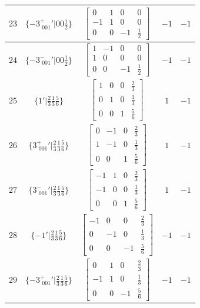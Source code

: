 \documentclass[fleqn,8pt]{jsarticle}
\begin{document}
\begin{longtable}{ccccc}
$ 23 $ & $ \{-3^{+}_{\,\,001}{}'|0 0 \frac{1}{2}\} $ & $ \begin{bmatrix} 0 & 1 & 0 & 0 \\ -1 & 1 & 0 & 0 \\ 0 & 0 & -1 & \frac{1}{2} \end{bmatrix} $ & $ -1 $ & $ -1 $ \\ \hline
$ 24 $ & $ \{-3^{-}_{\,\,001}{}'|0 0 \frac{1}{2}\} $ & $ \begin{bmatrix} 1 & -1 & 0 & 0 \\ 1 & 0 & 0 & 0 \\ 0 & 0 & -1 & \frac{1}{2} \end{bmatrix} $ & $ -1 $ & $ -1 $ \\ \hline
$ 25 $ & $ \{1{}'|\frac{2}{3} \frac{1}{3} \frac{5}{6}\} $ & $ \begin{bmatrix} 1 & 0 & 0 & \frac{2}{3} \\ 0 & 1 & 0 & \frac{1}{3} \\ 0 & 0 & 1 & \frac{5}{6} \end{bmatrix} $ & $ 1 $ & $ -1 $ \\ \hline
$ 26 $ & $ \{3^{+}_{\,\,001}{}'|\frac{2}{3} \frac{1}{3} \frac{5}{6}\} $ & $ \begin{bmatrix} 0 & -1 & 0 & \frac{2}{3} \\ 1 & -1 & 0 & \frac{1}{3} \\ 0 & 0 & 1 & \frac{5}{6} \end{bmatrix} $ & $ 1 $ & $ -1 $ \\ \hline
$ 27 $ & $ \{3^{-}_{\,\,001}{}'|\frac{2}{3} \frac{1}{3} \frac{5}{6}\} $ & $ \begin{bmatrix} -1 & 1 & 0 & \frac{2}{3} \\ -1 & 0 & 0 & \frac{1}{3} \\ 0 & 0 & 1 & \frac{5}{6} \end{bmatrix} $ & $ 1 $ & $ -1 $ \\ \hline
$ 28 $ & $ \{-1{}'|\frac{2}{3} \frac{1}{3} \frac{5}{6}\} $ & $ \begin{bmatrix} -1 & 0 & 0 & \frac{2}{3} \\ 0 & -1 & 0 & \frac{1}{3} \\ 0 & 0 & -1 & \frac{5}{6} \end{bmatrix} $ & $ -1 $ & $ -1 $ \\ \hline
$ 29 $ & $ \{-3^{+}_{\,\,001}{}'|\frac{2}{3} \frac{1}{3} \frac{5}{6}\} $ & $ \begin{bmatrix} 0 & 1 & 0 & \frac{2}{3} \\ -1 & 1 & 0 & \frac{1}{3} \\ 0 & 0 & -1 & \frac{5}{6} \end{bmatrix} $ & $ -1 $ & $ -1 $ \\ \hline

\end{longtable}
\end{document}
